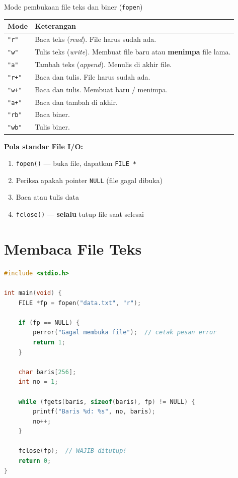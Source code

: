 \documentclass[../main.tex]{subfiles}
\begin{document}
\begin{modultable}[]{Mode pembukaan file teks dan biner (\texttt{fopen})}
\begin{tabular}{|l|p{9cm}|}
\hline
\textbf{Mode} & \textbf{Keterangan} \\
\hline
\texttt{"r"} & Baca teks (\textit{read}). File harus sudah ada. \\
\hline
\texttt{"w"} & Tulis teks (\textit{write}). Membuat file baru atau \textbf{menimpa} file lama. \\
\hline
\texttt{"a"} & Tambah teks (\textit{append}). Menulis di akhir file. \\
\hline
\texttt{"r+"} & Baca dan tulis. File harus sudah ada. \\
\hline
\texttt{"w+"} & Baca dan tulis. Membuat baru / menimpa. \\
\hline
\texttt{"a+"} & Baca dan tambah di akhir. \\
\hline
\texttt{"rb"} & Baca biner. \\
\hline
\texttt{"wb"} & Tulis biner. \\
\hline
\end{tabular}
\end{modultable}

\begin{konsep}
\textbf{Pola standar File I/O:}

\begin{enumerate}[nosep]
  \item \texttt{fopen()} --- buka file, dapatkan \texttt{FILE *}
  \item Periksa apakah pointer \texttt{NULL} (file gagal dibuka)
  \item Baca atau tulis data
  \item \texttt{fclose()} --- \textbf{selalu} tutup file saat selesai
\end{enumerate}
\end{konsep}

\section{Membaca File Teks}

\begin{lstlisting}[language=C,caption=Membaca file baris per baris]
#include <stdio.h>

int main(void) {
    FILE *fp = fopen("data.txt", "r");
    
    if (fp == NULL) {
        perror("Gagal membuka file");  // cetak pesan error
        return 1;
    }
    
    char baris[256];
    int no = 1;
    
    while (fgets(baris, sizeof(baris), fp) != NULL) {
        printf("Baris %d: %s", no, baris);
        no++;
    }
    
    fclose(fp);  // WAJIB ditutup!
    return 0;
}
\end{lstlisting}
\end{document}
